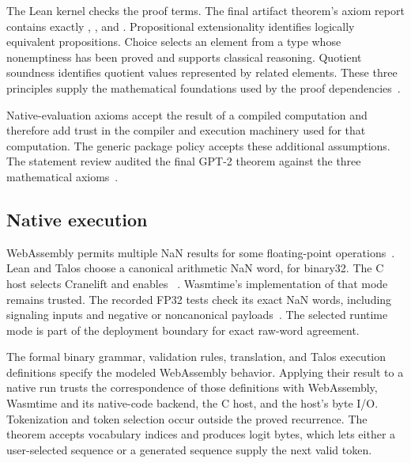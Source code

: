 The Lean kernel checks the proof terms.  The final artifact theorem's axiom report contains exactly , , and .  Propositional extensionality identifies logically equivalent propositions.  Choice selects an element from a type whose nonemptiness has been proved and supports classical reasoning.  Quotient soundness identifies quotient values represented by related elements.  These three principles supply the mathematical foundations used by the proof dependencies~\cite{leanaxioms,review}.

Native-evaluation axioms accept the result of a compiled computation and therefore add trust in the compiler and execution machinery used for that computation.  The generic package policy accepts these additional assumptions.  The statement review audited the final GPT-2 theorem against the three mathematical axioms~\cite{artifactgate,review}.

\subsection{Native execution}

WebAssembly permits multiple NaN results for some floating-point operations~\cite{wasmspec}.  Lean and Talos choose a canonical arithmetic NaN word,  for binary32.  The C host selects Cranelift and enables ~\cite{wasmtime,driver}.  Wasmtime's implementation of that mode remains trusted.  The recorded FP32 tests check its exact NaN words, including signaling inputs and negative or noncanonical payloads~\cite{tests}.  The selected runtime mode is part of the deployment boundary for exact raw-word agreement.

The formal binary grammar, validation rules, translation, and Talos execution definitions specify the modeled WebAssembly behavior.  Applying their result to a native run trusts the correspondence of those definitions with WebAssembly, Wasmtime and its native-code backend, the C host, and the host's byte I/O.  Tokenization and token selection occur outside the proved recurrence.  The theorem accepts vocabulary indices and produces logit bytes, which lets either a user-selected sequence or a generated sequence supply the next valid token.

